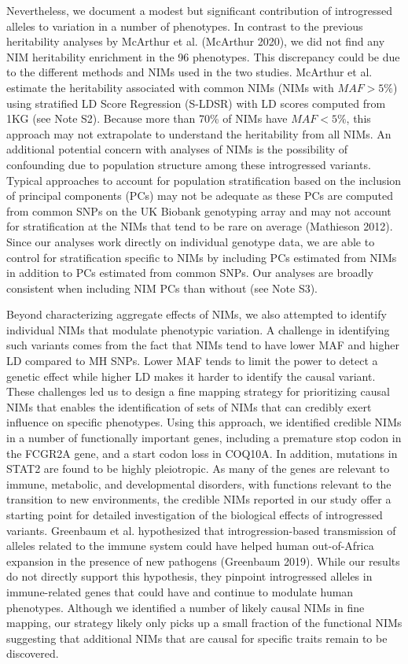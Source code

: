 Nevertheless, we document a modest but significant contribution of introgressed alleles to variation in a number of phenotypes. In contrast to the previous heritability analyses by McArthur et al. (McArthur 2020), we did not find any NIM heritability enrichment in the 96 phenotypes. This discrepancy could be due to the different methods and NIMs used in the two studies. McArthur et al. estimate the heritability associated with common NIMs (NIMs with $MAF > 5\%$) using stratified LD Score Regression (S-LDSR) with LD scores computed from 1KG (see Note S2). Because more than 70\% of NIMs have $MAF < 5\%$, this approach may not extrapolate to understand the heritability from all NIMs. An additional potential concern with analyses of NIMs is the possibility of confounding due to population structure among these introgressed variants. Typical approaches to account for population stratification based on the inclusion of principal components (PCs) may not be adequate as these PCs are computed from common SNPs on the UK Biobank genotyping array and may not account for stratification at the NIMs that tend to be rare on average (Mathieson 2012). Since our analyses work directly on individual genotype data, we are able to control for stratification specific to NIMs by including PCs estimated from NIMs in addition to PCs estimated from common SNPs. Our analyses are broadly consistent when including NIM PCs than without (see Note S3). 

Beyond characterizing aggregate effects of NIMs, we also attempted to identify individual NIMs that modulate phenotypic variation. A challenge in identifying such variants comes from the fact that NIMs tend to have lower MAF and higher LD compared to MH SNPs. Lower MAF tends to limit the power to detect a genetic effect while higher LD makes it harder to identify the causal variant. These challenges led us to design a fine mapping strategy for prioritizing causal NIMs that enables the identification of sets of NIMs that can credibly exert influence on specific phenotypes. Using this approach, we identified credible NIMs in a number of functionally important genes, including a premature stop codon in the FCGR2A gene, and a start codon loss in COQ10A. In addition, mutations in STAT2 are found to be highly pleiotropic. As many of the genes are relevant to immune, metabolic, and developmental disorders, with functions relevant to the transition to new environments, the credible NIMs reported in our study offer a starting point for detailed investigation of the biological effects of introgressed variants. Greenbaum et al. hypothesized that introgression-based transmission of alleles related to the immune system could have helped human out-of-Africa expansion in the presence of new pathogens (Greenbaum 2019). While our results do not directly support this hypothesis, they pinpoint introgressed alleles in immune-related genes that could have and continue to modulate human phenotypes. Although we identified a number of likely causal NIMs in fine mapping, our strategy likely only picks up a small fraction of the functional NIMs suggesting that additional NIMs that are causal for specific traits remain to be discovered. 


